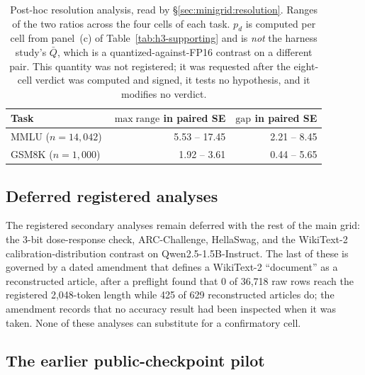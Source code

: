 \begin{table}[!t]
\centering
\small
\caption{Post-hoc resolution analysis, read by \S\ref{sec:minigrid:resolution}.
Ranges of the two ratios across the four cells of each task. $p_d$ is computed
per cell from panel~(c) of Table~\ref{tab:h3-supporting} and is \emph{not} the
harness study's $\bar{Q}$, which is a quantized-against-FP16 contrast on a
different pair. This quantity was not registered; it was requested after the
eight-cell verdict was computed and signed, it tests no hypothesis, and it
modifies no verdict.}
\label{tab:h3-resolution}
\begin{tabular}{lrr}
\toprule
Task & $\max\mathrm{range}$ in paired SE & $\mathrm{gap}$ in paired SE \\
\midrule
MMLU ($n = 14{,}042$) & 5.53 -- 17.45 & 2.21 -- 8.45 \\
GSM8K ($n = 1{,}000$) & 1.92 -- 3.61  & 0.44 -- 5.65 \\
\bottomrule
\end{tabular}
\end{table}

\subsection{Deferred registered analyses}
\label{app:minigrid:deferred}

The registered secondary analyses remain deferred with the rest of the main
grid: the 3-bit dose-response check, ARC-Challenge, HellaSwag, and the
WikiText-2 calibration-distribution contrast on Qwen2.5-1.5B-Instruct. The
last of these is governed by a dated amendment that defines a WikiText-2
``document'' as a reconstructed article, after a preflight found that
0 of 36{,}718 raw rows reach the registered 2{,}048-token length while 425 of
629 reconstructed articles do; the amendment records that no accuracy result had
been inspected when it was taken. None of these analyses can substitute for a
confirmatory cell.

\subsection{The earlier public-checkpoint pilot}
\label{app:minigrid:pilot}

